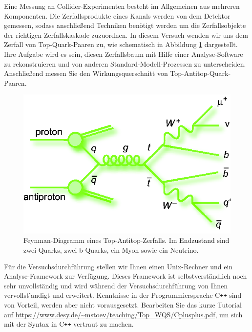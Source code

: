 	Eine Messung an Collider-Experimenten besteht im Allgemeinen aus mehreren Komponenten. Die Zerfallsprodukte eines Kanals werden von dem Detektor gemessen, sodass anschlie\ss{}end Techniken ben\"otigt werden um die Zerfallsobjekte der richtigen Zerfallskaskade zuzuordnen. In diesem Versuch wenden wir uns dem Zerfall von Top-Quark-Paaren zu, wie schematisch in Abbildung \ref{ttbarsemilep} dargestellt. Ihre Aufgabe wird es sein, diesen Zerfallsbaum mit Hilfe einer Analyse-Software zu rekonstruieren und von anderen Standard-Modell-Prozessen zu unterscheiden. Anschlie\ss{}end messen Sie den Wirkungsquerschnitt von Top-Antitop-Quark-Paaren.
\begin{figure}[h]
\centerline{\includegraphics[scale=0.5]{pics_feynman_ttbar_mujets}}
\caption{Feynman-Diagramm eines Top-Antitop-Zerfalls. Im Endzustand sind zwei Quarks, zwei b-Quarks, ein Myon sowie ein Neutrino.}
\label{ttbarsemilep}
\end{figure}

F\"ur die Versuchsdurchf\"uhrung stellen wir Ihnen einen Unix-Rechner und ein Analyse-Framework zur Verf\"ugung. Dieses Framework ist selbstverst\"andlich noch sehr unvollst\"andig und wird w\"ahrend der Versuchsdurchf\"uhrung von Ihnen vervollst\''andigt und erweitert. Kenntnisse in der Programmiersprache C\texttt{++} sind von Vorteil, werden aber nicht vorausgesetzt. Bearbeiten Sie das kurze Tutorial auf
\url{https://www.desy.de/~mstoev/teaching/Top_WQS/Cplusplus.pdf}, um sich mit der Syntax in C\texttt{++} vertraut zu machen.\\

